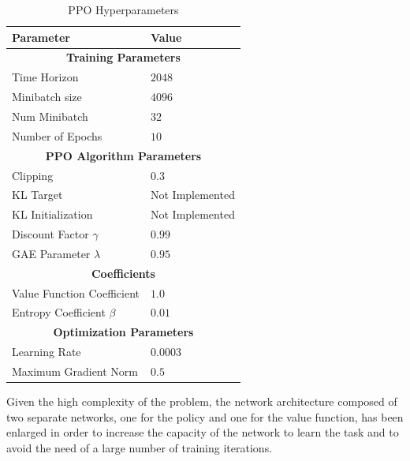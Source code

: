 \begin{table}[h]
    \centering
    \begin{tabular}{ll}
        \toprule
        \textbf{Parameter}          & \textbf{Value}          \\
        \midrule
        \multicolumn{2}{c}{\textbf{Training Parameters}}      \\
        Time Horizon                & $2048$                  \\
        Minibatch size              & $4096$                  \\
        Num Minibatch               & $32$                    \\
        Number of Epochs            & $10$                    \\
        \midrule
        \multicolumn{2}{c}{\textbf{PPO Algorithm Parameters}} \\
        Clipping                    & $0.3$                   \\
        KL Target                   & Not Implemented         \\
        KL Initialization           & Not Implemented         \\
        Discount Factor $\gamma$    & $0.99$                  \\
        GAE Parameter $\lambda$     & $0.95$                  \\
        \midrule
        \multicolumn{2}{c}{\textbf{Coefficients}}             \\
        Value Function Coefficient  & $1.0$                   \\
        Entropy Coefficient $\beta$ & $0.01$                  \\
        \midrule
        \multicolumn{2}{c}{\textbf{Optimization Parameters}}  \\
        Learning Rate               & $0.0003$                \\
        Maximum Gradient Norm       & $0.5$                   \\
        \bottomrule
    \end{tabular}
    \caption{PPO Hyperparameters}
\end{table}

Given the high complexity of the problem, the network architecture composed of two separate networks, one for the policy and one for the value function, has been enlarged in order to increase the capacity of the network to learn the task and to avoid the need of a large number of training iterations.

